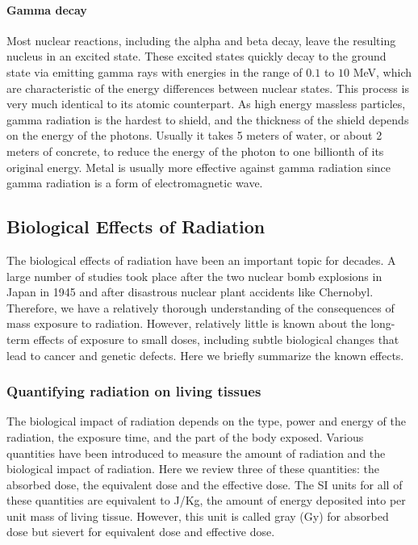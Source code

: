 \documentclass[nofootinbib,preprint,aps]{revtex4-1}
\begin{document}
        \paragraph{Gamma decay}
        Most nuclear reactions, including the alpha and beta decay, leave the resulting nucleus in an excited state.
        These excited states quickly decay to the ground state via emitting gamma rays with energies in the range
        of $0.1$ to $10$ MeV, which are characteristic of the energy differences between nuclear states.
        This process is very much identical to its atomic counterpart. As high energy massless particles, gamma
        radiation is the hardest to shield, and the thickness of the shield depends on the energy of the photons.
        Usually it takes 5 meters of water, or about 2 meters of concrete,  to reduce the energy of the photon
        to one billionth of its original energy. Metal is usually more effective against gamma radiation since
        gamma radiation is a form of electromagnetic wave.\cite[chap. 1]{l01}

    \subsection{Biological Effects of Radiation}
        The biological effects of radiation have been an important topic for decades. A large
        number of studies took place after the two nuclear bomb explosions in Japan in 1945
        and after disastrous nuclear plant accidents like Chernobyl. Therefore, we have a relatively
        thorough understanding of the consequences of mass exposure to radiation. However, relatively
        little is known about the long-term effects of exposure to small doses, including subtle biological
        changes that lead to cancer and genetic defects. Here we briefly summarize the known effects.
        \subsubsection{Quantifying radiation on living tissues}
        The biological impact of radiation depends on the type, power and energy of the radiation, the
        exposure time, and the part of the body exposed. Various quantities have been introduced to
        measure the amount of radiation and the biological impact of radiation. Here we review three
        of these quantities: the absorbed dose, the equivalent dose and the effective dose.
        The SI units for all of these quantities are equivalent to J/Kg, the amount of energy deposited into
        per unit mass of living tissue. However, this unit is called gray (Gy) for absorbed dose but sievert
        for equivalent dose and effective dose.
\end{document}
